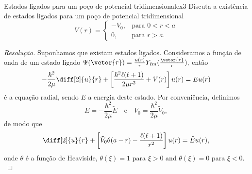 \begin{exercício}{Estados ligados para um poço de potencial tridimensional}{ex3}
    Discuta a existência de estados ligados para um poço de potencial tridimensional
    \begin{equation*}
        V(r) = \begin{cases}
            -V_0, & \text{para } 0 < r < a\\
            0,& \text{para } r > a.
        \end{cases}
    \end{equation*}
\end{exercício}
\begin{proof}[Resolução]
    Suponhamos que existam estados ligados. Consideramos a função de onda de um estado ligado \(\Psi(\vetor{r}) = \frac{u(r)}{r}Y_{\ell m}(\frac{\vetor{r}}{r}),\) então
    \begin{equation*}
        -\frac{\hbar^2}{2\mu} \diff[2]{u}{r} + \left[\frac{\hbar^2 \ell (\ell + 1)}{2\mu r^2} + V(r)\right]u(r) = Eu(r)
    \end{equation*}
    é a equação radial, sendo \(E\) a energia deste estado. Por conveniência, definimos
    \begin{equation*}
        E = -\frac{\hbar^2}{2\mu} \tilde{E}
        \quad\text{e}\quad
        V_0 = \frac{\hbar^2}{2\mu} \tilde{V}_0,
    \end{equation*}
    de modo que
    \begin{equation*}
        \diff[2]{u}{r} + \left[\tilde{V}_0 \theta(a - r) - \frac{\ell(\ell+1)}{r^2}\right]u(r) = \tilde{E} u(r),
    \end{equation*}
    onde \(\theta\) é a função de Heaviside, \(\theta(\xi) = 1\) para \(\xi > 0\) and \(\theta(\xi) = 0\) para \(\xi < 0.\) 


\end{proof}
